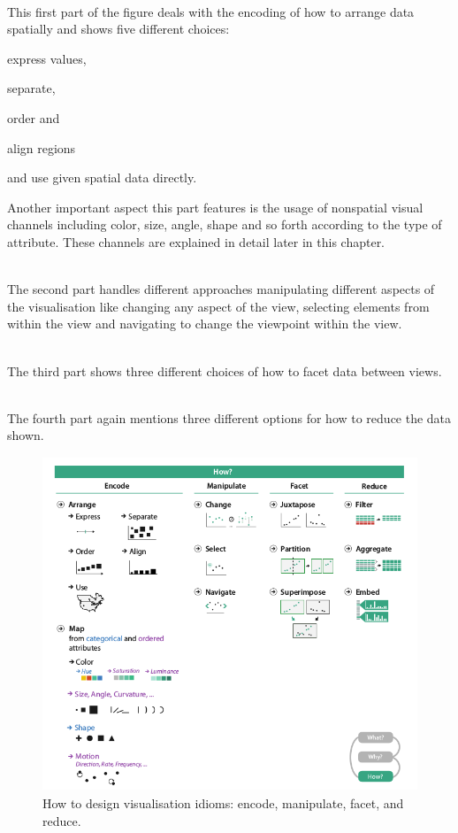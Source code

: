 \begin{enumerate}

 \hfill \\
This first part of the figure deals with the encoding of how to arrange data spatially and shows five different choices:
    \begin{enumerate*}
    \item express values,
    \item separate,
    \item order and
    \item align regions
    \item and use given spatial data directly.
    \end{enumerate*}
Another important aspect this part features is the usage of nonspatial visual channels including color, size, angle, shape and so forth according to the type of attribute. These channels are explained in detail later in this chapter.

 \hfill \\
The second part handles different approaches manipulating different aspects of the visualisation like changing any aspect of the view, selecting elements from within the view and navigating to change the viewpoint within the view.

 \hfill \\
The third part shows three different choices of how to facet data between views.

 \hfill \\
The fourth part again mentions three different options for how to reduce the data shown.

\end{enumerate}

\begin{figure}[!hbt]
\centering
\includegraphics[height=10cm,keepaspectratio]{images/basics/how.png}
\caption[
    How to design visualisation idioms: encode, manipulate, facet, and reduce .
]{How to design visualisation idioms: encode, manipulate, facet, and reduce.}
\label{fig:how}
\end{figure}

